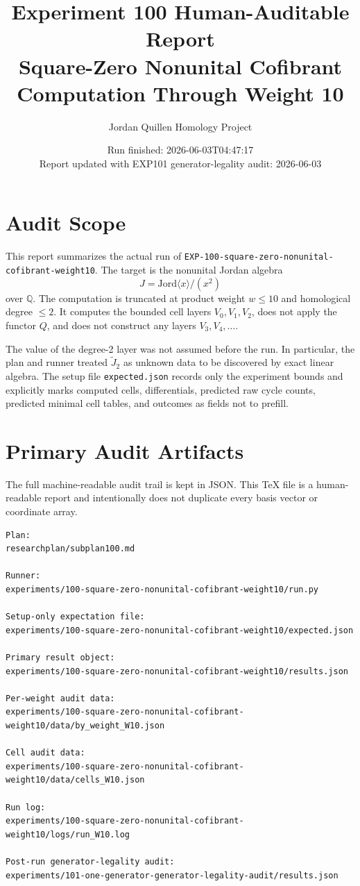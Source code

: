 \documentclass[11pt]{article}
\title{Experiment 100 Human-Auditable Report\\
\large Square-Zero Nonunital Cofibrant Computation Through Weight 10}
\author{Jordan Quillen Homology Project}
\date{Run finished: 2026-06-03T04:47:17\\
Report updated with EXP101 generator-legality audit: 2026-06-03}
\begin{document}
\maketitle

\section*{Audit Scope}

This report summarizes the actual run of
\texttt{EXP-100-square-zero-nonunital-cofibrant-weight10}.  The target is the
nonunital Jordan algebra
\[
J=\mathrm{Jord}\langle x\rangle/(x^2)
\]
over \(\mathbb{Q}\).  The computation is truncated at product weight
\(w\leq 10\) and homological degree \(\leq 2\).  It computes the bounded cell
layers \(V_0,V_1,V_2\), does not apply the functor \(Q\), and does not
construct any layers \(V_3,V_4,\ldots\).

The value of the degree-2 layer was not assumed before the run.  In
particular, the plan and runner treated \(\widetilde{J}_2\) as unknown data to
be discovered by exact linear algebra.  The setup file
\texttt{expected.json} records only the experiment bounds and explicitly marks
computed cells, differentials, predicted raw cycle counts, predicted minimal
cell tables, and outcomes as fields not to prefill.

\section*{Primary Audit Artifacts}

The full machine-readable audit trail is kept in JSON.  This TeX file is a
human-readable report and intentionally does not duplicate every basis vector
or coordinate array.

\begin{lstlisting}
Plan:
researchplan/subplan100.md

Runner:
experiments/100-square-zero-nonunital-cofibrant-weight10/run.py

Setup-only expectation file:
experiments/100-square-zero-nonunital-cofibrant-weight10/expected.json

Primary result object:
experiments/100-square-zero-nonunital-cofibrant-weight10/results.json

Per-weight audit data:
experiments/100-square-zero-nonunital-cofibrant-weight10/data/by_weight_W10.json

Cell audit data:
experiments/100-square-zero-nonunital-cofibrant-weight10/data/cells_W10.json

Run log:
experiments/100-square-zero-nonunital-cofibrant-weight10/logs/run_W10.log

Post-run generator-legality audit:
experiments/101-one-generator-generator-legality-audit/results.json
\end{lstlisting}
\end{document}
